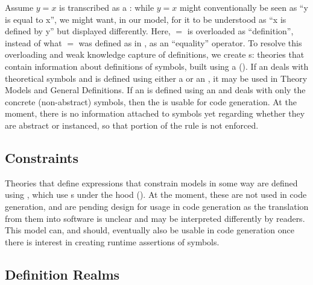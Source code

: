 Assume \(y = x\) is transcribed as a \RelationConcept{}: while \(y = x\) might
conventionally be seen as ``y is equal to x'', we might want, in our model, for
it to be understood as ``x is defined by y'' but displayed differently. Here,
\(=\) is overloaded as ``definition'', instead of what \(=\) was defined as in
\Expr{}, as an ``equality'' operator. To resolve this overloading and weak
knowledge capture of definitions, we create \EquationalModel{}s: theories that
contain information about definitions of symbols, built using a \QDefinition{}
(). If an \EquationalModel{} deals with
theoretical symbols and is defined using either a \ModelExpr{} or an \Expr{}, it
may be used in Theory Models and General Definitions. If an \EquationalModel{}
is defined using an \Expr{} and deals with only the concrete (non-abstract)
symbols, then the \EquationalModel{} is usable for code generation. At the
moment, there is no information attached to symbols yet regarding whether they
are abstract or instanced, so that portion of the rule is not enforced.


\subsection{Constraints}

\currentConstraintSetHaskell{}

Theories that define expressions that constrain models in some way are defined
using \EquationalConstraints{}, which use \ConstraintSet{}s under the hood
(). At the moment, these are not used in code generation, and are pending
design for usage in code generation as the translation from them into software
is unclear and may be interpreted differently by readers. This model can, and
should, eventually also be usable in code generation once there is interest in
creating runtime assertions of symbols.


\subsection{Definition Realms}

\currentDefiningExprHaskell{}

